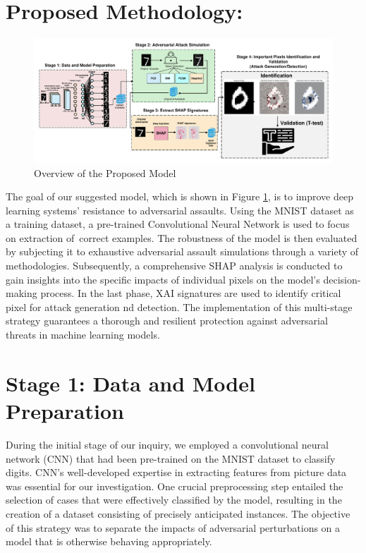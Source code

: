 \documentclass[10pt, conference, a4paper, final]{IEEEtran}
\begin{document}
\section{Proposed Methodology:}

\begin{figure}[!ht]
    \centering
    \includegraphics[width=1\textwidth]{paper_images/papermodel_v2.pdf}
    \caption{Overview of the Proposed Model}
    \label{overview}
\end{figure}
   
The goal of our suggested model, which is shown in Figure \ref {overview}, is to improve deep learning systems' 
resistance to adversarial assaults. Using the MNIST dataset as a training dataset, a pre-trained Convolutional 
Neural Network is used to focus on extraction of correct examples. The robustness of the model is then evaluated 
by subjecting it to exhaustive adversarial assault simulations through a variety of methodologies. Subsequently, 
a comprehensive SHAP analysis is conducted to gain insights into the specific impacts of individual pixels on the 
model's decision-making process. In the last phase, XAI signatures are used to identify critical pixel for attack 
generation nd detection. The implementation of this multi-stage strategy guarantees a thorough and resilient protection 
against adversarial threats in machine learning models.


\section{Stage 1: Data and Model Preparation}

During the initial stage of our inquiry, we employed a convolutional neural network (CNN) that had been pre-trained on 
the MNIST dataset to classify digits. CNN's well-developed expertise in extracting features from picture data was essential 
for our investigation. One crucial preprocessing step entailed the selection of cases that were effectively classified by the 
model, resulting in the creation of a dataset consisting of precisely anticipated instances. The objective of this strategy was 
to separate the impacts of adversarial perturbations on a model that is otherwise behaving appropriately.
\end{document}
